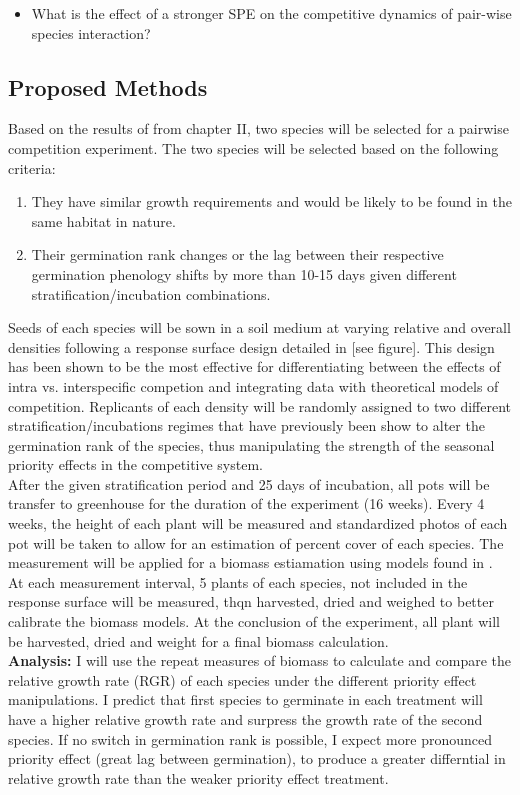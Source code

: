 \documentclass{article}\usepackage[]{graphicx}\usepackage[]{color}
\begin{document}
{{\begin{itemize}
\item What is the effect of a stronger SPE on the competitive dynamics of pair-wise species interaction?
\end{itemize}
\subsection*{Proposed Methods}
\indent Based on the results of from chapter II, two species will be selected for a pairwise competition experiment. The two species will be selected based on the following criteria:
\begin{enumerate}
\item They have similar growth requirements and would be likely to be found in the same habitat in nature.
\item Their germination rank changes or the lag between their respective germination phenology shifts by more than 10-15 days given different stratification/incubation combinations.
\end{enumerate}
Seeds of each species will be sown in a soil medium at varying relative and overall densities following a response surface design detailed in \cite{Inouye_2000} [see figure]. This design has been shown to be the most effective for differentiating between the effects of intra vs. interspecific competion and integrating data with theoretical models of competition.  Replicants of each density will be randomly assigned to two different stratification/incubations regimes that have previously been show to alter the germination rank of the species, thus manipulating the strength of the seasonal priority effects in the competitive system.\\
After the given stratification period and 25 days of incubation, all pots will be transfer to greenhouse for the duration of the experiment (16 weeks). Every 4 weeks, the height of each plant will be measured and standardized photos of each pot will be taken to allow for an estimation of percent cover of each species. The measurement will be applied for a biomass estiamation using models found in \cite*{Axmanova_2012}. At each measurement interval, 5 plants of each species, not included in the response surface will be measured, thqn harvested, dried and weighed to better calibrate the biomass models. At the conclusion of the experiment, all plant will be harvested, dried and weight for a final biomass calculation.\\
\textbf{Analysis:} I will use the repeat measures of biomass to calculate and compare the relative growth rate (RGR) \citep{} of each species under the different priority effect manipulations. I predict that first species to germinate in each treatment will have a higher relative growth rate and surpress the growth rate of the second species. If no switch in germination rank is possible, I expect more pronounced priority effect (great lag between germination), to produce a greater differntial in relative growth rate than the weaker priority effect treatment.\\  


}}
\end{document}
